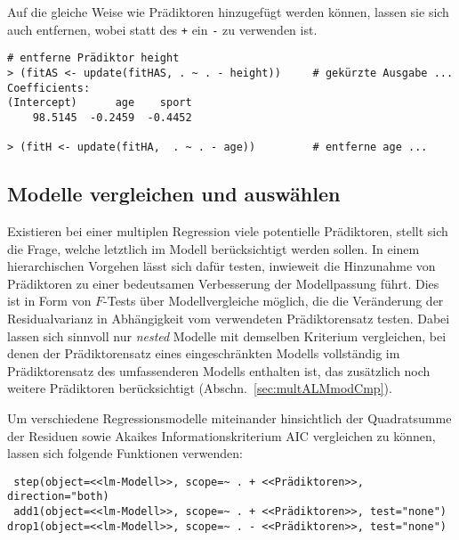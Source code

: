 Auf die gleiche Weise wie Prädiktoren hinzugefügt werden können, lassen sie sich auch entfernen, wobei statt des \lstinline!+! ein \lstinline!-! zu verwenden ist.
\begin{lstlisting}
# entferne Prädiktor height
> (fitAS <- update(fitHAS, . ~ . - height))     # gekürzte Ausgabe ...
Coefficients:
(Intercept)      age    sport
    98.5145  -0.2459  -0.4452

> (fitH <- update(fitHA,  . ~ . - age))         # entferne age ...
\end{lstlisting}

\subsection{Modelle vergleichen und auswählen}
\label{sec:regrCmp}

Existieren bei einer multiplen Regression viele potentielle Prädiktoren, stellt sich die Frage, welche letztlich im Modell berücksichtigt werden sollen. In einem hierarchischen Vorgehen lässt sich dafür testen, inwieweit die Hinzunahme von Prädiktoren zu einer bedeutsamen Verbesserung der Modellpassung führt. Dies ist in Form von $F$-Tests über Modellvergleiche möglich, die die Veränderung der Residualvarianz in Abhängigkeit vom verwendeten Prädiktorensatz testen. Dabei lassen sich sinnvoll nur \emph{nested} Modelle mit demselben Kriterium vergleichen, bei denen der Prädiktorensatz eines eingeschränkten Modells vollständig im Prädiktorensatz des umfassenderen Modells enthalten ist, das zusätzlich noch weitere Prädiktoren berücksichtigt (Abschn.\ \ref{sec:multALMmodCmp}).

Um verschiedene Regressionsmodelle miteinander hinsichtlich der Quadratsumme der Residuen sowie Akaikes Informationskriterium AIC vergleichen zu können, lassen sich folgende Funktionen verwenden:
\begin{lstlisting}
 step(object=<<lm-Modell>>, scope=~ . + <<Prädiktoren>>, direction="both)
 add1(object=<<lm-Modell>>, scope=~ . + <<Prädiktoren>>, test="none")
drop1(object=<<lm-Modell>>, scope=~ . - <<Prädiktoren>>, test="none")
\end{lstlisting}

